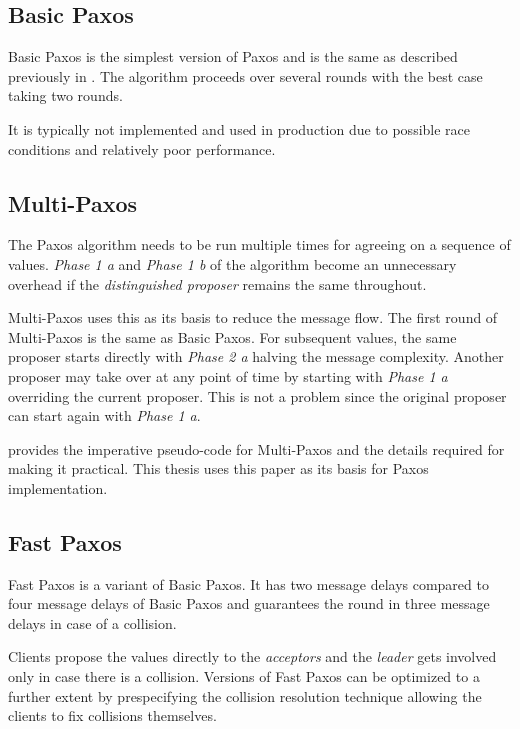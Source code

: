 \subsection{Basic Paxos}

Basic Paxos is the simplest version of Paxos and is the same as described 
previously in . The algorithm proceeds over several rounds
with the best case taking two rounds.

It is typically not implemented and used in production due to possible race
conditions and relatively poor performance.

\subsection{Multi-Paxos}

The Paxos algorithm needs to be run multiple times for agreeing on a sequence of
values. \emph{Phase 1 a} and \emph{Phase 1 b} of the algorithm become 
an unnecessary overhead if the \emph{distinguished proposer} remains the same 
throughout.

Multi-Paxos uses this as its basis to reduce the message flow. The first round 
of Multi-Paxos is the same as Basic Paxos. For subsequent values, the same
proposer starts directly with \emph{Phase 2 a} halving the message complexity.
Another proposer may take over at any point of time by starting with 
\emph{Phase 1 a} overriding the current proposer. This is not a problem since 
the original proposer can start again with \emph{Phase 1 a}.

\citet{Robbert2011} provides the imperative pseudo-code for Multi-Paxos and
the details required for making it practical. This thesis uses this paper as 
its basis for Paxos implementation.

\subsection{Fast Paxos}

Fast Paxos \citep{MSRTR2005112} is a variant of Basic Paxos. It has two
message delays compared to four message delays of Basic Paxos and guarantees
the round in three message delays in case of a collision.

Clients propose the values directly to the \emph{acceptors} and the 
\emph{leader} gets involved only in case there is a collision. Versions of Fast
Paxos can be optimized to a further extent by prespecifying the collision
resolution technique allowing the clients to fix collisions themselves.

